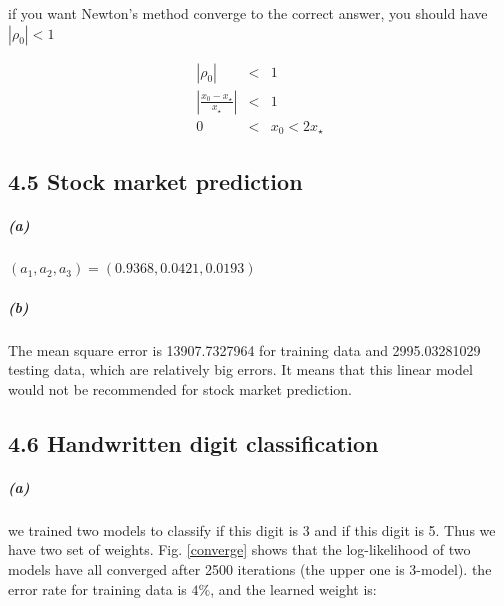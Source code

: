 \documentclass{article}
\begin{document}
if you want Newton’s method converge to the correct answer, you should have $|\rho_0| < 1$

\begin{eqnarray*}
	|\rho_0| &<& 1\\
	|\frac{x_0 - x_{\star}}{x_{\star}}| &<& 1\\
	0 &<& x_0 < 2x_{\star}
\end{eqnarray*}

\subsection*{4.5 Stock market prediction}
\subparagraph*{(a)}
$(a_1,a_2,a_3) = (0.9368, 0.0421, 0.0193)$
\subparagraph*{(b)}
The mean square error is 13907.7327964 for training data and 2995.03281029 testing data, which are relatively big errors. It means that this linear model would not be recommended for stock market prediction.

\subsection*{4.6 Handwritten digit classification}
\subparagraph*{(a)}
we trained two models to classify if this digit is 3 and if this digit is 5. Thus we have two set of weights. Fig. \ref{converge} shows that the log-likelihood of two models have all converged after 2500 iterations (the upper one is 3-model). the error rate for training data is $4\%$, and the learned weight is:
\end{document}
